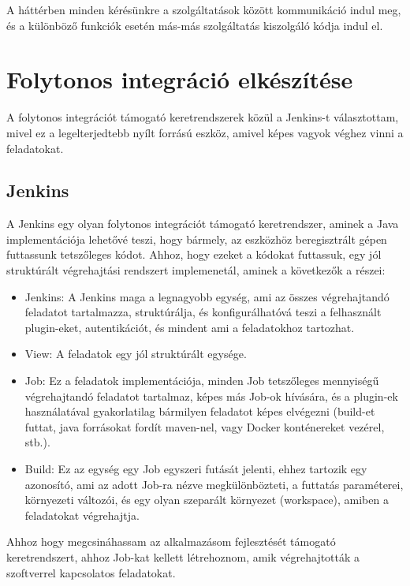 \documentclass[11pt,magyar,a4paper,twoside,]{report}
\providecommand{\tightlist}{%
  \setlength{\itemsep}{0pt}\setlength{\parskip}{0pt}}
\begin{document}
A háttérben minden kérésünkre a szolgáltatások között kommunikáció indul
meg, és a különböző funkciók esetén más-más szolgáltatás kiszolgáló
kódja indul el.

\section{Folytonos integráció
elkészítése}\label{folytonos-integruxe1ciuxf3-elkuxe9szuxedtuxe9se}

A folytonos integrációt támogató keretrendszerek közül a Jenkins-t
választottam, mivel ez a legelterjedtebb nyílt forrású eszköz, amivel
képes vagyok véghez vinni a feladatokat.

\subsection{Jenkins}\label{jenkins}

A Jenkins egy olyan folytonos integrációt támogató keretrendszer, aminek
a Java implementációja lehetővé teszi, hogy bármely, az eszközhöz
beregisztrált gépen futtassunk tetszőleges kódot. Ahhoz, hogy ezeket a
kódokat futtassuk, egy jól struktúrált végrehajtási rendszert
implemenetál, aminek a következők a részei:

\begin{itemize}
\tightlist
\item
  Jenkins: A Jenkins maga a legnagyobb egység, ami az összes
  végrehajtandó feladatot tartalmazza, struktúrálja, és konfigurálhatóvá
  teszi a felhasznált plugin-eket, autentikációt, és mindent ami a
  feladatokhoz tartozhat.
\item
  View: A feladatok egy jól struktúrált egysége.
\item
  Job: Ez a feladatok implementációja, minden Job tetszőleges mennyiségű
  végrehajtandó feladatot tartalmaz, képes más Job-ok hívására, és a
  plugin-ek használatával gyakorlatilag bármilyen feladatot képes
  elvégezni (build-et futtat, java forrásokat fordít maven-nel, vagy
  Docker konténereket vezérel, stb.).
\item
  Build: Ez az egység egy Job egyszeri futását jelenti, ehhez tartozik
  egy azonosító, ami az adott Job-ra nézve megkülönbözteti, a futtatás
  paraméterei, környezeti változói, és egy olyan szeparált környezet
  (workspace), amiben a feladatokat végrehajtja.
\end{itemize}

Ahhoz hogy megcsináhassam az alkalmazásom fejlesztését támogató
keretrendszert, ahhoz Job-kat kellett létrehoznom, amik végrehajtották a
szoftverrel kapcsolatos feladatokat.
\end{document}
